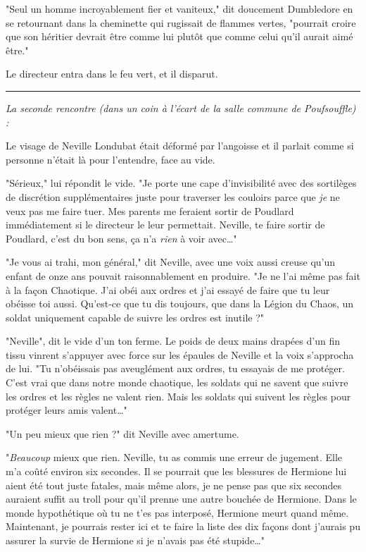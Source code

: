 "Seul un homme incroyablement fier et vaniteux," dit doucement Dumbledore en se retournant dans la cheminette qui rugissait de flammes vertes, "pourrait croire que son héritier devrait être comme lui plutôt que comme celui qu'il aurait aimé être."

Le directeur entra dans le feu vert, et il disparut.
\par\noindent\rule{\textwidth}{0.4pt}
\emph{La seconde rencontre (dans un coin à l'écart de la salle commune de Poufsouffle) :} 

Le visage de Neville Londubat était déformé par l'angoisse et il parlait comme si personne n'était là pour l'entendre, face au vide.

"Sérieux," lui répondit le vide. "Je porte une cape d'invisibilité avec des sortilèges de discrétion supplémentaires juste pour traverser les couloirs parce que \emph{je}  ne veux pas me faire tuer. Mes parents me feraient sortir de Poudlard immédiatement si le directeur le leur permettait. Neville, te faire sortir de Poudlard, c'est du bon sens, ça n'a \emph{rien}  à voir avec…"

"Je vous ai trahi, mon général," dit Neville, avec une voix aussi creuse qu'un enfant de onze ans pouvait raisonnablement en produire. "Je ne l'ai même pas fait à la façon Chaotique. J'ai obéi aux ordres et j'ai essayé de faire que tu leur obéisse toi aussi. Qu'est-ce que tu dis toujours, que dans la Légion du Chaos, un soldat uniquement capable de suivre les ordres est inutile ?"

"Neville", dit le vide d'un ton ferme. Le poids de deux mains drapées d'un fin tissu vinrent s'appuyer avec force sur les épaules de Neville et la voix s'approcha de lui. "Tu n'obéissais pas aveuglément aux ordres, tu essayais de me protéger. C'est vrai que dans notre monde chaotique, les soldats qui ne savent que suivre les ordres et les règles ne valent rien. Mais les soldats qui suivent les règles pour protéger leurs amis valent…"

"Un peu mieux que rien ?" dit Neville avec amertume.

"\emph{Beaucoup}  mieux que rien. Neville, tu as commis une erreur de jugement. Elle m'a coûté environ six secondes. Il se pourrait que les blessures de Hermione lui aient été tout juste fatales, mais même alors, je ne pense pas que six secondes auraient suffit au troll pour qu'il prenne une autre bouchée de Hermione. Dans le monde hypothétique où tu ne t'es pas interposé, Hermione meurt quand même. Maintenant, je pourrais rester ici et te faire la liste des dix façons dont j'aurais pu assurer la survie de Hermione si je n'avais pas été stupide…"

